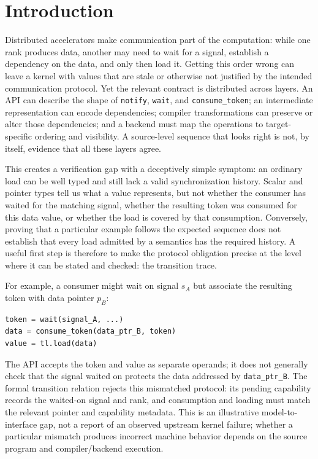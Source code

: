 \documentclass[a4paper,USenglish]{lipics-v2021}
\begin{document}
\section{Introduction}
Distributed accelerators make communication part of the computation: while one rank produces data, another may need to wait for a signal, establish a dependency on the data, and only then load it. Getting this order wrong can leave a kernel with values that are stale or otherwise not justified by the intended communication protocol. Yet the relevant contract is distributed across layers. An API can describe the shape of \texttt{notify}, \texttt{wait}, and \texttt{consume\_token}; an intermediate representation can encode dependencies; compiler transformations can preserve or alter those dependencies; and a backend must map the operations to target-specific ordering and visibility. A source-level sequence that looks right is not, by itself, evidence that all these layers agree.

This creates a verification gap with a deceptively simple symptom: an ordinary load can be well typed and still lack a valid synchronization history. Scalar and pointer types tell us what a value represents, but not whether the consumer has waited for the matching signal, whether the resulting token was consumed for this data value, or whether the load is covered by that consumption. Conversely, proving that a particular example follows the expected sequence does not establish that every load admitted by a semantics has the required history. A useful first step is therefore to make the protocol obligation precise at the level where it can be stated and checked: the transition trace.

For example, a consumer might wait on signal \(s_A\) but associate the resulting token with data pointer \(p_B\):
\begin{lstlisting}[language=Python]
token = wait(signal_A, ...)
data = consume_token(data_ptr_B, token)
value = tl.load(data)
\end{lstlisting}
The API accepts the token and value as separate operands; it does not generally check that the signal waited on protects the data addressed by \texttt{data\_ptr\_B}. The formal transition relation rejects this mismatched protocol: its pending capability records the waited-on signal and rank, and consumption and loading must match the relevant pointer and capability metadata. This is an illustrative model-to-interface gap, not a report of an observed upstream kernel failure; whether a particular mismatch produces incorrect machine behavior depends on the source program and compiler/backend execution.
\end{document}

